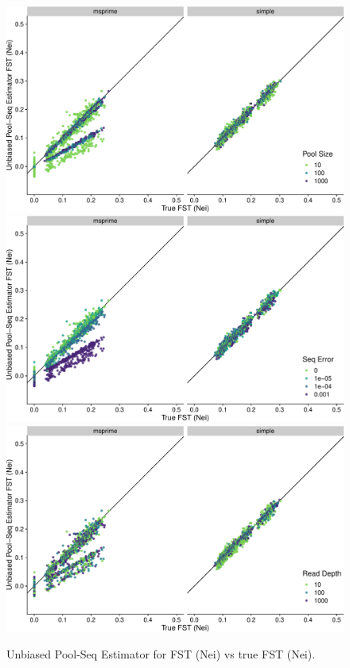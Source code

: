 \documentclass[a4paper,fontsize=9pt,DIV=14]{scrartcl}
\begin{document}
\begin{figure}[p]
    \centering
    \includegraphics[width=.75\linewidth]{true_nei_fst-est_spence_nei-pool_size.pdf}
    \includegraphics[width=.75\linewidth]{true_nei_fst-est_spence_nei-seq_error.pdf}
    \includegraphics[width=.75\linewidth]{true_nei_fst-est_spence_nei-read_depth.pdf}
    \vspace*{-1em}
    \caption{
        Unbiased Pool-Seq Estimator for FST (Nei) vs true FST (Nei).
    }
\label{fig:UnbiasedNei}
\end{figure}
\end{document}
